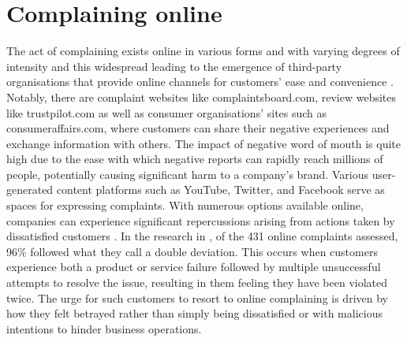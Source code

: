 \section{Complaining online}

The act of complaining exists online in various forms and with varying degrees of intensity and this widespread leading to the emergence of third-party organisations that provide online channels for customers' ease and convenience \cite{tripp_when_2011}. Notably, there are complaint websites like complaintsboard.com, review websites like trustpilot.com as well as consumer organisations' sites such as consumeraffairs.com, where customers can share their negative experiences and exchange information with others. The impact of negative word of mouth is quite high due to the ease with which negative reports can rapidly reach millions of people, potentially causing significant harm to a company's brand. Various user-generated content platforms such as YouTube, Twitter, and Facebook serve as spaces for expressing complaints. With numerous options available online, companies can experience significant repercussions arising from actions taken by dissatisfied customers \cite{tripp_when_2011}.
\newline \newline
In the research in \cite{tripp_when_2011}, of the 431 online complaints assessed, 96\% followed what they call a double deviation. This occurs when customers experience both a product or service failure followed by multiple unsuccessful attempts to resolve the issue, resulting in them feeling they have been violated twice. The urge for such customers to resort to online complaining is driven by how they felt betrayed rather than simply being dissatisfied or with malicious intentions to hinder business operations.




